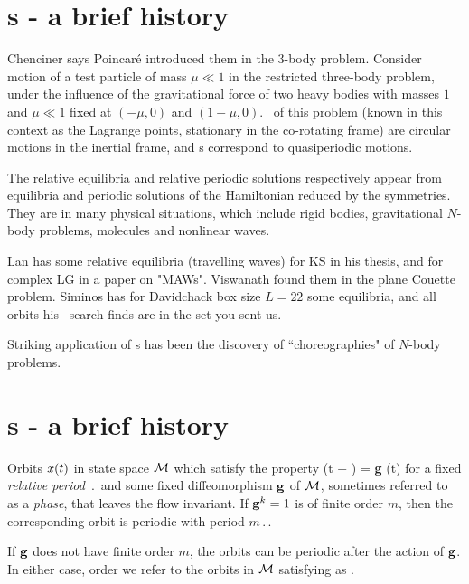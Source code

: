 %


\section{{\Rpo s} - a brief history}

Chenciner
says Poincar\'e introduced them in the 3-body problem.
Consider motion of a test particle of mass
$\mu \ll 1$ in the
restricted three-body problem,
under the
influence of the gravitational force of two heavy bodies with masses $1$ and
$\mu \ll 1$ fixed at $(-\mu,0)$ and $(1-\mu,0)$. \Reqv\ of this problem
(known in this context as the Lagrange points, stationary in
the co-rotating frame) are circular motions in the inertial frame,
and {\rpo s} correspond to quasiperiodic motions. 

The relative equilibria and relative periodic solutions 
respectively appear from
equilibria and periodic solutions of the Hamiltonian reduced by the symmetries.
They are in many physical situations, which include rigid bodies, gravitational
$N$-body problems, molecules and nonlinear waves.

Lan has some relative equilibria (travelling waves) for KS in his
thesis, %
 and for complex LG in a paper on "MAWs".
Viswanath %
found them in the plane Couette problem.
Siminos has for Davidchack box size $L=22$ some equilibria, and all
orbits his \rpo\ search finds are in the set you sent us.

Striking application of \rpo s has been the discovery
of ``choreographies" of $N$-body problems.


\section{{\Rpo s} - a brief history}

Orbits $x (t)$ in
state space ${\cal M}$ which satisfy the property
\beq
  \pSpace (t + \period{} ) = {\bf g} \cdot \pSpace (t)                       
\label{relper}
\eeq
for a fixed {\em relative period} $\period{}$
and some fixed diffeomorphism ${\bf g}$ of ${\cal M}$, 
sometimes referred to as a {\em phase}, that leaves the 
flow invariant. If ${\bf g}^k=1$ is of finite order
$m$, then the corresponding orbit is periodic with period $m\period{}$. 

If ${\bf g}$ does not have finite order $m$, the
orbits can be periodic after the action of ${\bf g}$. 
In either case, order we refer to the orbits
in ${\cal M}$ satisfying  as 
{\em \rpo}. 

